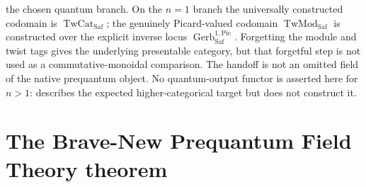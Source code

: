 \begin{construction}
the chosen quantum branch.  On the $n=1$ branch the universally constructed
codomain is $\operatorname{TwCat}_{\mathrm{Saf}}$; the genuinely Picard-valued
codomain $\operatorname{TwMod}_{\mathrm{Saf}}$ is constructed over the explicit
inverse locus $\operatorname{Gerb}^{1,\mathrm{Pic}}_{\mathrm{Saf}}$.  Forgetting
the module and twist tags gives the underlying presentable category, but that
forgetful step is not used as a commutative-monoidal comparison.  The handoff is
not an omitted field of the native prequantum object.  No quantum-output functor
is asserted here for $n>1$: \cite[Remark~3.14]{Safronov2020} describes the
expected higher-categorical target but does not construct it.
\end{construction}

\section{The Brave-New Prequantum Field Theory theorem}
\label{sec:prequantum-final-package}

